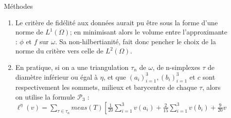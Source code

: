 \documentclass[final]{beamer}
\newlength{\sepwid}
\newlength{\onecolwid}
\newlength{\twocolwid}
\begin{document}
\begin{frame}[t]
\begin{columns}[t]
\begin{column}{\twocolwid}
\begin{columns}[t,totalwidth=\twocolwid]
\begin{column}{\onecolwid}
\begin{block}{Méthodes}
\begin{enumerate}
\item Le critère de fidélité aux données aurait pu être sous la forme d'une norme de $L^1(\Omega)$;
en minimisant alors le volume entre l'approximante : $\phi$ et $f$ sur $\omega$.
Sa non-hilbertianité, fait donc pencher le choix de la norme du critère vers celle de $L^2(\Omega)$.
\item En pratique, si on a une triangulation $\tau_n$ de $\omega$, de n-simplexes $\tau$ de diamètre inférieur ou égal à $\eta$, et que $(a_i)_{i=1}^3 ,(b_i)_{i=1}^3$ et $c$ sont respectivement les sommets, milieux et barycentre de chaque $\tau$, alors on utilise la formule $\mathcal{P}_3$ : $\ell^{\eta}(v) = \sum_{\tau \in \tau_n}{meas(T)[\frac{1}{20}\sum_{i=1}^3{v(a_i)}+\frac{2}{15}\sum_{i=1}^3{v(b_i)}+\frac{9}{20}v(c)]}$
\end{enumerate}
\end{block}



\end{column} %

\end{columns} %

\end{column} %

\begin{column}{\sepwid}\end{column} %

\begin{column}{\onecolwid} %



\end{column}
\end{columns}
\end{frame}
\end{document}
